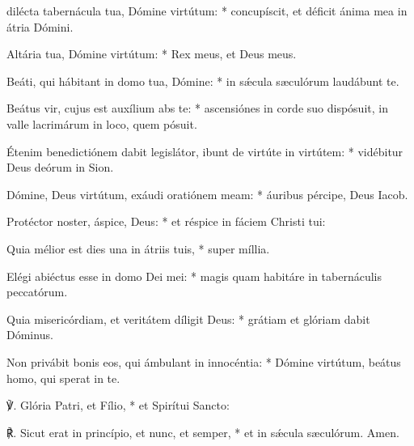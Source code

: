 { dilécta tabernácula tua, Dómine virtútum: * concupíscit, et déficit ánima mea in átria Dómini.\par
{}
Altária tua, Dómine virtútum: * Rex meus, et Deus meus.\par
Beáti, qui hábitant in domo tua, Dómine: * in sǽcula s{\ae}culórum laudábunt te.\par
Beátus vir, cujus est auxílium abs te: * ascensiónes in corde suo dispósuit, in valle lacrimárum in loco, quem pósuit.\par
Étenim benedictiónem dabit legislátor, ibunt de virtúte in virtútem: * vidébitur Deus deórum in Sion.\par
Dómine, Deus virtútum, exáudi oratiónem meam: * áuribus pércipe, Deus Iacob.\par
Protéctor noster, áspice, Deus: * et réspice in fáciem Christi tui:\par
Quia mélior est dies una in átriis tuis, * super míllia.\par
Elégi abiéctus esse in domo Dei mei: * magis quam habitáre in tabernáculis peccatórum.\par
Quia misericórdiam, et veritátem díligit Deus: * grátiam et glóriam dabit Dóminus.\par
Non privábit bonis eos, qui ámbulant in innocéntia: * Dómine virtútum, beátus homo, qui sperat in te.\par
℣. Glória Patri, et Fílio, * et Spirítui Sancto:\par
℟. Sicut erat in princípio, et nunc, et semper, * et in sǽcula s{\ae}culórum. Amen.}

